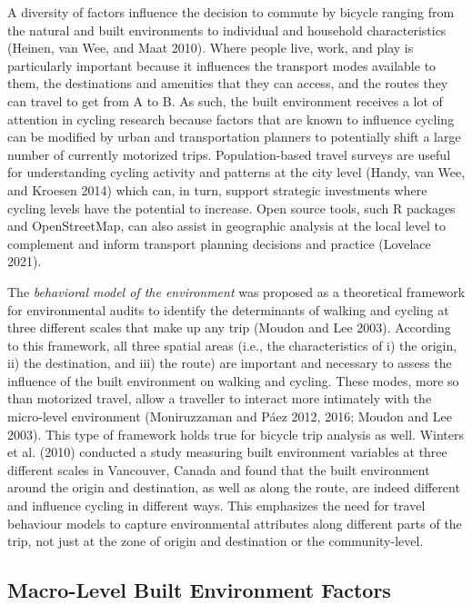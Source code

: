 \documentclass[smallextended]{svjour3}       %
\begin{document}
A diversity of factors influence the decision to commute by bicycle
ranging from the natural and built environments to individual and
household characteristics (Heinen, van Wee, and Maat 2010). Where people
live, work, and play is particularly important because it influences the
transport modes available to them, the destinations and amenities that
they can access, and the routes they can travel to get from A to B. As
such, the built environment receives a lot of attention in cycling
research because factors that are known to influence cycling can be
modified by urban and transportation planners to potentially shift a
large number of currently motorized trips. Population-based travel
surveys are useful for understanding cycling activity and patterns at
the city level (Handy, van Wee, and Kroesen 2014) which can, in turn,
support strategic investments where cycling levels have the potential to
increase. Open source tools, such R packages and OpenStreetMap, can also
assist in geographic analysis at the local level to complement and
inform transport planning decisions and practice (Lovelace 2021).

The \emph{behavioral model of the environment} was proposed as a
theoretical framework for environmental audits to identify the
determinants of walking and cycling at three different scales that make
up any trip (Moudon and Lee 2003). According to this framework, all
three spatial areas (i.e., the characteristics of i) the origin, ii) the
destination, and iii) the route) are important and necessary to assess
the influence of the built environment on walking and cycling. These
modes, more so than motorized travel, allow a traveller to interact more
intimately with the micro-level environment (Moniruzzaman and Páez 2012,
2016; Moudon and Lee 2003). This type of framework holds true for
bicycle trip analysis as well. Winters et al. (2010) conducted a study
measuring built environment variables at three different scales in
Vancouver, Canada and found that the built environment around the origin
and destination, as well as along the route, are indeed different and
influence cycling in different ways. This emphasizes the need for travel
behaviour models to capture environmental attributes along different
parts of the trip, not just at the zone of origin and destination or the
community-level.

\hypertarget{macro}{%
\subsection{Macro-Level Built Environment Factors}\label{macro}}
\end{document}
